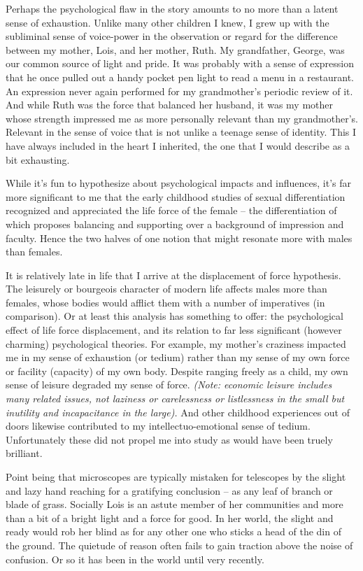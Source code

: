 

Perhaps the psychological flaw in the story amounts to no more than a
latent sense of exhaustion.  Unlike many other children I knew, I grew
up with the subliminal sense of voice-power in the observation or
regard for the difference between my mother, Lois, and her mother,
Ruth.  My grandfather, George, was our common source of light and
pride.  It was probably with a sense of expression that he once pulled
out a handy pocket pen light to read a menu in a restaurant.  An
expression never again performed for my grandmother's periodic review
of it.  And while Ruth was the force that balanced her husband, it was
my mother whose strength impressed me as more personally relevant than
my grandmother's.  Relevant in the sense of voice that is not unlike a
teenage sense of identity.  This I have always included in the heart I
inherited, the one that I would describe as a bit exhausting.

While it's fun to hypothesize about psychological impacts and
influences, it's far more significant to me that the early childhood
studies of sexual differentiation recognized and appreciated the life
force of the female -- the differentiation of which proposes balancing
and supporting over a background of impression and faculty.  Hence the
two halves of one notion that might resonate more with males than
females.

It is relatively late in life that I arrive at the displacement of
force hypothesis.  The leisurely or bourgeois character of modern life
affects males more than females, whose bodies would afflict them with
a number of imperatives (in comparison).  Or at least this analysis
has something to offer: the psychological effect of life force
displacement, and its relation to far less significant (however
charming) psychological theories.  For example, my mother's craziness
impacted me in my sense of exhaustion (or tedium) rather than my sense
of my own force or facility (capacity) of my own body.  Despite
ranging freely as a child, my own sense of leisure degraded my sense
of force.  {\it (Note: economic leisure includes many related issues,
not laziness or carelessness or listlessness in the small but
inutility and incapacitance in the large).}  And other childhood
experiences out of doors likewise contributed to my
intellectuo-emotional sense of tedium.  Unfortunately these did not
propel me into study as would have been truely brilliant.

Point being that microscopes are typically mistaken for telescopes by
the slight and lazy hand reaching for a gratifying conclusion -- as
any leaf of branch or blade of grass.  Socially Lois is an astute
member of her communities and more than a bit of a bright light and a
force for good.  In her world, the slight and ready would rob her
blind as for any other one who sticks a head of the din of the ground.
The quietude of reason often fails to gain traction above the noise of
confusion.  Or so it has been in the world until very recently.

\bye
